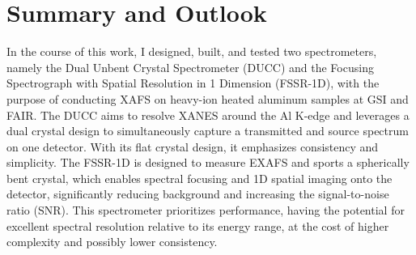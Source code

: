 \chapter{Summary and Outlook}
\label{chapter: outlook}

In the course of this work, I designed, built, and tested two spectrometers, namely the Dual Unbent Crystal 
Spectrometer (DUCC) and the Focusing Spectrograph 
with Spatial Resolution in 1 Dimension (FSSR-1D), with the purpose of conducting XAFS on heavy-ion heated aluminum samples at GSI and FAIR. The 
DUCC aims to resolve XANES around the Al K-edge and 
leverages a dual crystal design to simultaneously 
capture a transmitted and source spectrum on 
one detector. With its flat crystal design, it emphasizes consistency and simplicity. The FSSR-1D is designed to measure 
EXAFS and sports a spherically bent crystal, which 
enables spectral focusing and 1D spatial imaging onto 
the detector, significantly reducing background and 
increasing the signal-to-noise ratio (SNR). This spectrometer prioritizes performance, having the potential for excellent spectral resolution relative to its energy range, at the cost of higher complexity and possibly lower consistency. 

